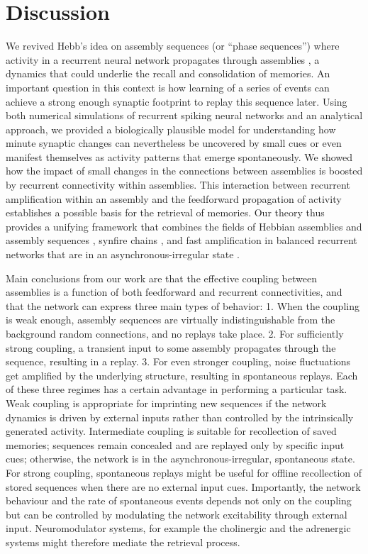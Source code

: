 \section{Discussion} 
\label{sec:asss_disc}
  We revived Hebb's idea on assembly sequences (or ``phase sequences'') where
  activity in a recurrent neural network propagates through assemblies
  \citep{Hebb49}, a dynamics that could underlie the recall and consolidation of
  memories. An important question in this context is how learning of a series
  of events can achieve a strong enough synaptic footprint to replay this
  sequence later.  Using both numerical simulations of recurrent spiking neural
  networks and an analytical approach, we provided a biologically plausible
  model for understanding how minute synaptic changes can nevertheless be
  uncovered by small cues or even manifest themselves as activity patterns that
  emerge spontaneously. We showed how the impact of small changes in the
  connections between assemblies is boosted by recurrent connectivity within
  assemblies.  This interaction between recurrent amplification within an
  assembly and the feedforward propagation of activity establishes a possible
  basis for the retrieval of memories. Our theory thus provides a unifying
  framework that combines the fields of Hebbian assemblies and assembly
  sequences \citep{Hebb49}, synfire chains \citep{Abeles1991, Diesmann1999}, and fast
  amplification in balanced recurrent networks that are in an
  asynchronous-irregular state \citep{Murphy2009, Vogels2011}.

  Main conclusions from our work are that the effective coupling between
  assemblies is a function of both feedforward and recurrent connectivities,
  and that the network can express three main types of behavior: 1. When the
  coupling is weak enough, assembly sequences are virtually indistinguishable
  from the background random connections, and no replays take place. 2. For
  sufficiently strong coupling, a transient input to some assembly propagates
  through the sequence, resulting in a replay. 3. For even stronger coupling,
  noise fluctuations get amplified by the underlying structure, resulting in
  spontaneous replays. Each of these three regimes has a certain advantage in
  performing a particular task. Weak coupling is appropriate for imprinting new
  sequences if the network dynamics is driven by external inputs rather than
  controlled by the intrinsically generated activity. Intermediate coupling is
  suitable for recollection of saved memories; sequences remain concealed and
  are replayed only by specific input cues; otherwise, the network is in the
  asynchronous-irregular, spontaneous state. For strong coupling, spontaneous
  replays might be useful for offline recollection of stored sequences when
  there are no external input cues. Importantly, the network behaviour and the
  rate of spontaneous events depends not only on the coupling but can be
  controlled by modulating the network excitability through external input.
  Neuromodulator systems, for example the cholinergic and the adrenergic
  systems \citep{Hasselmo1995, Thomas2015} might therefore mediate the retrieval
  process.

